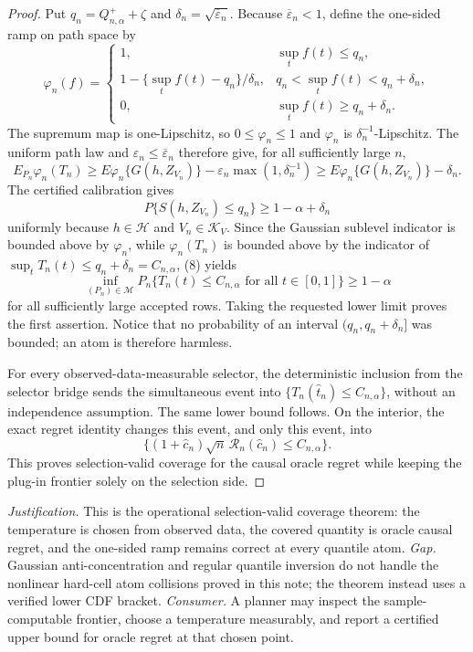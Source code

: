 \documentclass{article}
\begin{document}
\begin{proof}
Put \(q_n=Q^+_{n,\alpha}+\zeta\) and \(\delta_n=\sqrt{\overline\varepsilon_n}\).  Because \(\overline\varepsilon_n<1\), define the one-sided ramp on path space by
\[
 \varphi_n(f)=
 \begin{cases}
 1,&\sup_tf(t)\le q_n,\\
 1-\{\sup_tf(t)-q_n\}/\delta_n,&q_n<\sup_tf(t)<q_n+\delta_n,\\
 0,&\sup_tf(t)\ge q_n+\delta_n.
 \end{cases}
\]
The supremum map is one-Lipschitz, so \(0\le\varphi_n\le1\) and \(\varphi_n\) is \(\delta_n^{-1}\)-Lipschitz.  The uniform path law and \(\varepsilon_n\le\overline\varepsilon_n\) therefore give, for all sufficiently large \(n\),
\[
 E_{P_n}\varphi_n(T_n)
 \ge E\varphi_n\{G(h,Z_{V_n})\}
      -\varepsilon_n\max(1,\delta_n^{-1})
 \ge E\varphi_n\{G(h,Z_{V_n})\}-\delta_n.             \tag{8}
\]
The certified calibration gives
\[
 P\{S(h,Z_{V_n})\le q_n\}\ge1-\alpha+\delta_n
\]
uniformly because \(h\in\mathcal H\) and \(V_n\in\mathcal K_V\).  Since the Gaussian sublevel indicator is bounded above by \(\varphi_n\), while \(\varphi_n(T_n)\) is bounded above by the indicator of \(\sup_tT_n(t)\le q_n+\delta_n=C_{n,\alpha}\), (8) yields
\[
 \inf_{(P_n)\in\mathcal M}P_n\{T_n(t)\le C_{n,\alpha}
       \text{ for all }t\in[0,1]\}\ge1-\alpha
\]
for all sufficiently large accepted rows.  Taking the requested lower limit proves the first assertion.  Notice that no probability of an interval \((q_n,q_n+\delta_n]\) was bounded; an atom is therefore harmless.

For every observed-data-measurable selector, the deterministic inclusion from the selector bridge sends the simultaneous event into \(\{T_n(\widehat t_n)\le C_{n,\alpha}\}\), without an independence assumption.  The same lower bound follows.  On the interior, the exact regret identity changes this event, and only this event, into
\[
 \{(1+\widehat c_n)\sqrt n\,\mathscr R_n(\widehat c_n)\le C_{n,\alpha}\}.
\]
This proves selection-valid coverage for the causal oracle regret while keeping the plug-in frontier solely on the selection side.
\end{proof}
\par\smallskip\noindent \textit{Justification.} This is the operational selection-valid coverage theorem: the temperature is chosen from observed data, the covered quantity is oracle causal regret, and the one-sided ramp remains correct at every quantile atom. \textit{Gap.} Gaussian anti-concentration and regular quantile inversion do not handle the nonlinear hard-cell atom collisions proved in this note; the theorem instead uses a verified lower CDF bracket. \textit{Consumer.} A planner may inspect the sample-computable frontier, choose a temperature measurably, and report a certified upper bound for oracle regret at that chosen point.
\end{document}

